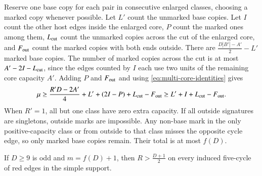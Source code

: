 Reserve one base copy for each pair in consecutive enlarged
classes, choosing a marked copy whenever possible. Let $L'$
count the unmarked base copies. Let $I$ count the other host
edges inside the enlarged core, $P$ count the marked ones among
them, $L_{\rm cut}$ count the unmarked copies across the cut of
the enlarged core, and $F_{\rm out}$ count the marked copies with both ends
outside. There are $\frac{D|B'|-A'}{2}-L'$ marked base copies.
The number of marked copies across the cut is at most
$A'-2I-L_{\rm cut}$, since the edges counted by $I$ each use two
units of the remaining core capacity $A'$. Adding $P$ and $F_{\rm out}$ and
using \eqref{eq:multi-core-identities} gives
\begin{equation}\label{eq:multi-extra-capacity}
 \mu\ge \frac{R'D-2A'}{4}+L'+(2I-P)+L_{\rm cut}-F_{\rm out}
 \ge L'+I+L_{\rm cut}-F_{\rm out} .
\end{equation}
When $R'=1$, all but one class have zero extra capacity. If all
outside signatures are singletons, outside marks are impossible.
Any non-base mark in the only positive-capacity class or from
outside to that class misses the opposite cycle edge, so only marked
base copies remain. Their total is at most $f(D)$.

\begin{lemma}\label{lem:half-degree-cycle}
If $D\ge9$ is odd and $m=f(D)+1$, then $R>\frac{D+1}{2}$ on
every induced five-cycle of red edges in the simple support.
\end{lemma}


